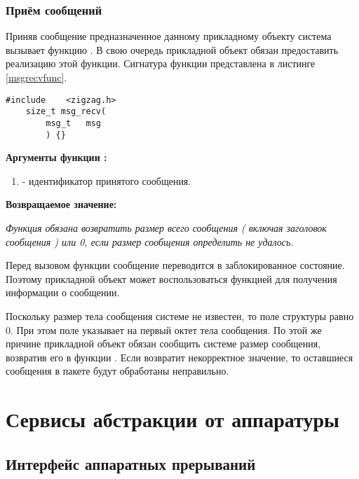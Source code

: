 \subsubsection{Приём сообщений}

Приняв сообщение предназначенное данному прикладному объекту система \zigzag вызывает функцию
. В свою очередь прикладной объект обязан предоставить реализацию этой функции.
Сигнатура функции представлена в листинге \ref{msgrecvfunc}.

\begin{lstlisting}[caption=Функция \myfunc{msg\_recv()} - приём сообщения., label=msgrecvfunc ]
    #include    <zigzag.h>
    size_t msg_recv(
        msg_t   msg
        ) {}
\end{lstlisting}

{\bfseries Аргументы функции :}

{\itshape
\begin{enumerate} 
\item {} - идентификатор принятого сообщения.
\end{enumerate}
}

{\bfseries Возвращаемое значение:}

{\itshape
Функция обязана возвратить размер всего сообщения ( включая заголовок сообщения ) или 0, если размер
сообщения определить не удалось.
}

Перед вызовом функции  сообщение переводится в заблокированное состояние. Поэтому прикладной
объект может воспользоваться функцией  для получения информации о сообщении.

Поскольку размер тела сообщения системе не известен, то поле  структуры  равно 0. При этом поле
 указывает на первый октет тела сообщения. По этой же причине прикладной объект обязан сообщить
системе размер сообщения, возвратив его в функции . Если  возвратит 
некорректное значение, то оставшиеся сообщения в пакете будут обработаны неправильно.

\section{Сервисы абстракции от аппаратуры}

\subsection{Интерфейс аппаратных прерываний}
